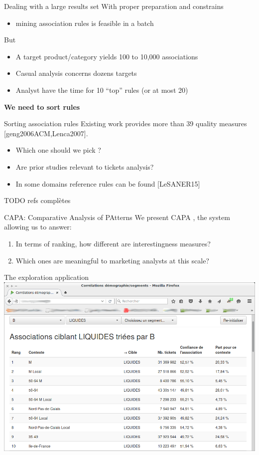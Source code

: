 \documentclass[table]{beamer}
\providecommand{\capa}{\mbox{\textsc{CAPA}} }
\begin{document}
\begin{frame}{Dealing with a large results set}
  With proper preparation and constrains
  \begin{itemize}
    \item mining association rules is feasible in a batch
  \end{itemize}
  But
  \begin{itemize}
    \item A target product/category yields 100 to 10,000 associations
    \item Casual analysis concerns dozens targets
    \item Analyst have the time for 10 ``top'' rules (or at most 20)
  \end{itemize}
  \pause
  {\bf We need to sort rules}
\end{frame}



\begin{frame}{Sorting association rules}
  Existing work provides more than 39 quality measures [geng2006ACM,Lenca2007].

  \begin{itemize}
    \item Which one should we pick ?
    \item Are prior studies relevant to tickets analysis?
    \item In some domains reference rules can be found [LeSANER15]\\
  \end{itemize}

  TODO refs complètes
\end{frame}

\begin{frame}{CAPA: Comparative Analysis of PAtterns}
  We present \capa, the system allowing us to answer:
  \begin{enumerate}
    \item In terms of ranking, how different are interestingness measures?
    \item Which ones are meaningful to marketing analysts at this scale?
  \end{enumerate}
\end{frame}

\begin{frame}{The exploration application}
  \centering
  \includegraphics[width=0.8\linewidth]{../fig/screenshot_exploration.png}
\end{frame}
\end{document}
